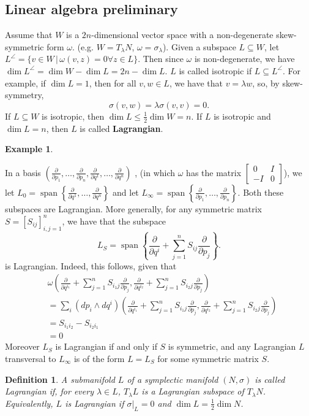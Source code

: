 \documentclass{article}
\newcommand{\w}{\omega}
\newcommand{\pd}[1]{\frac{\partial}{\partial #1}}
\DeclareMathOperator{\spn}{span}
\newtheorem{ex}{Example}
\newtheorem{defn}{Definition}
\begin{document}
\subsection{Linear algebra preliminary}
Assume that $W$ is a $2n$-dimensional vector space with a non-degenerate skew-symmetric form $\w$. (e.g. $W=T_\lambda N$, $\w = \sigma_\lambda$). Given a subspace $L\subseteq W$, let $L^\angle = \{v\in W\,|\,\w(v,z) = 0\forall z\in L\}$. Then since $\w$ is non-degenerate, we have $\dim L^\angle = \dim W - \dim L = 2n - \dim L$. $L$ is called isotropic if $L\subseteq L^\angle$. For example, if $\dim L = 1$, then for all $v,w\in L$, we have that $v=\lambda w$, so, by skew-symmetry,
\[\sigma(v,w) = \lambda \sigma(v,v) = 0.\]
If $L\subseteq W$ is isotropic, then $\dim L\leq \frac{1}{2}\dim W = n$. If $L$ is isotropic and $\dim L = n$, then $L$ is called \textbf{Lagrangian}.
\begin{ex}
    
\end{ex}
In a basis $\left(\pd{p_1},\dots,\pd{p_n},\pd{q^1},\dots,\pd{q^n}\right)$ ,  (in which $\w$ has the matrix $\begin{bmatrix}0 & I \\ -I & 0\end{bmatrix}$), we let $L_0 = \spn\left\{\pd{q^1},\dots,\pd{q^n}\right\}$ and let $L_\infty =
\spn\left\{\pd{p_1},\dots,\pd{p_n}\right\}$. Both these subspaces are Lagrangian. More generally, for any symmetric matrix $S = [S_{ij}]_{i,j=1}^n$, we have that the subspace
\[L_S = \spn\left\{\pd{q^i} + \sum_{j=1}^n S_{ij}\pd{p_j}\right\}.\]
is Lagrangian. Indeed, this follows, given that
\begin{align*}
    &\w\left(\pd{q^{i_1}} + \sum_{j=1}^n S_{i_1j}\pd{p_j},\pd{q^{i_2}} + \sum_{j=1}^n S_{i_2j}\pd{p_j}\right)\\
    &=\sum_i (dp_i\wedge dq^i)\left(\pd{q^{i_1}} + \sum_{j=1}^n S_{i_1j}\pd{p_j},\pd{q^{i_2}} + \sum_{j=1}^n S_{i_2j}\pd{p_j}\right)\\
    &=S_{i_1i_2} - S_{i_2i_1}\\
    &=0
\end{align*}
Moreover $L_S$ is Lagrangian if and only if $S$ is symmetric, and any Lagrangian $L$ transversal to $L_\infty$ is of the form $L=L_S$ for some symmetric matrix $S$.
\begin{defn}
    A submanifold $L$ of a symplectic manifold $(N,\sigma)$
 is called Lagrangian if, for every $\lambda\in L$, $T_\lambda L$ is a Lagrangian subspace of $T_\lambda N$. Equivalently, $L$ is Lagrangian if $\sigma|_L = 0$ and $\dim L = \frac{1}{2}\dim N$.
\end{defn}
\end{document}
